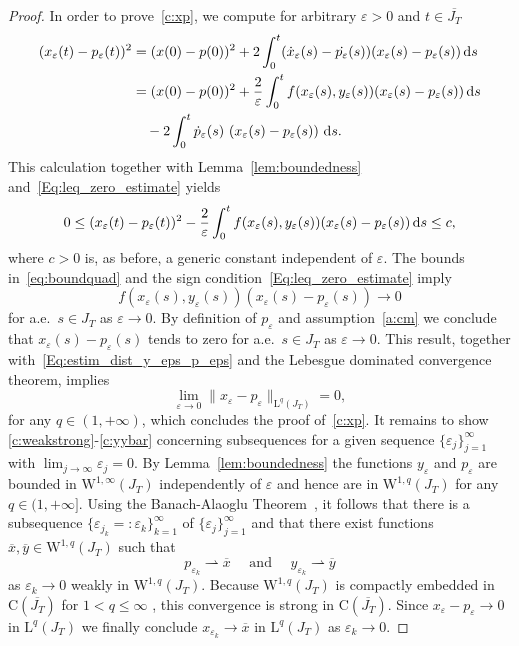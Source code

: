 \documentclass[12pt]{article}
\def\I{\infty}
\def\txtd{{\textnormal{d}}}
\newcommand{\be}{\begin{equation}}
\newcommand{\ee}{\end{equation}}
\newcommand{\benn}{\begin{equation*}}
\newcommand{\eenn}{\end{equation*}}
\def\ra{\rightarrow}
\def\I{\infty}
\begin{document}
\begin{proof}
In order to prove~\ref{c:xp}, we compute for arbitrary $\varepsilon>0$ and 
$t\in\overline{J_T}$
\begin{align*}
(x_\varepsilon(t)-p_{\varepsilon}(t))^2 &= (x(0)-p(0))^2 
+ 2\int_0^t (\dot{x}_\varepsilon(s) - \dot{p_{\varepsilon}}(s)) (x_\varepsilon(s)
-p_{\varepsilon}(s)) \, \txtd s\\
&= (x(0)-p(0))^2 + \frac{2}{\varepsilon}\int_0^t f(x_\varepsilon(s),y_\varepsilon(s)) 
(x_\varepsilon(s)-p_{\varepsilon}(s))\, \txtd s\\
&\quad -2\int_0^t \dot{p}_{\varepsilon}(s)~ (x_\varepsilon(s)-p_{\varepsilon}(s))~\txtd s.
\end{align*}
This calculation together with Lemma~\ref{lem:boundedness} 
and~\eqref{Eq:leq_zero_estimate} yields
\be
\label{eq:boundquad}
0\leq (x_\varepsilon(t)-p_{\varepsilon}(t))^2 - 
\frac{2}{\varepsilon}\int_0^t f( x_\varepsilon(s) , y_\varepsilon(s) ) 
(x_\varepsilon(s)-p_{\varepsilon}(s))\, \txtd s\leq c,
\ee
where $c>0$ is, as before, a generic constant independent of $\varepsilon$.	The bounds 
in~\eqref{eq:boundquad} and the sign condition~\eqref{Eq:leq_zero_estimate} imply
\benn
f( x_\varepsilon(s) , y_\varepsilon(s) )(x_\varepsilon(s)-p_{\varepsilon}(s))\ra 0
\eenn
for a.e.~$s\in J_T$ as $\varepsilon\rightarrow 0$. By definition of $p_\varepsilon$ and 
assumption~\ref{a:cm} we conclude that $x_\varepsilon(s)-p_{\varepsilon}(s)$ tends to 
zero for a.e.~$s\in J_T$ as $\varepsilon\rightarrow 0$. This result, together 
with~\eqref{Eq:estim_dist_y_eps_p_eps} and the Lebesgue dominated convergence theorem, 
implies
\benn
\lim_{\varepsilon\ra 0}\|x_\varepsilon - p_\varepsilon \|_{\mathrm{L}^q(J_T)} = 0,
\eenn
for any $q\in(1,+\I)$, which concludes the proof of~\ref{c:xp}. It remains to show  
\ref{c:weakstrong}-\ref{c:yybar} concerning subsequences for a given sequence 
$\{\varepsilon_j\}_{j=1}^\I$ with $\lim_{j\ra \I}\varepsilon_j=0$. By 
Lemma~\ref{lem:boundedness} the functions $y_{\varepsilon}$ and $p_{\varepsilon}$ are 
bounded in $\mathrm{W}^{1,\infty}(J_T)$ independently of $\varepsilon$ and hence are
in $\mathrm{W}^{1,q}(J_T)$ for any $q\in(1,+\I]$. Using the Banach-Alaoglu
Theorem~\cite{RudinFunc}, it follows that there is a subsequence 
$\{\varepsilon_{j_k}=:\varepsilon_k\}_{k=1}^\I$ of $\{\varepsilon_j\}_{j=1}^\I$ and 
that there exist functions $\overline{x},\overline{y}\in \mathrm{W}^{1,q}(J_T)$ such 
that
\be
\label{Conv_subseq_p_and_x1}
p_{\varepsilon_k} \rightharpoonup \overline{x} \quad 
\text{ and } \quad y_{\varepsilon_k} \rightharpoonup \overline{y}
\ee
as $\varepsilon_k \rightarrow 0$ weakly in $\mathrm{W}^{1,q}(J_T)$. Because 
$\mathrm{W}^{1,q}(J_T)$ is compactly embedded in $\mathrm{C}(\overline{J_T})$ for 
$1<q\leq \infty$ \cite[Theorem~6.3]{AdamsFournier}, this convergence is strong in 
$\mathrm{C}(\overline{J_T})$. Since $x_\varepsilon - p_\varepsilon \rightarrow 0$ 
in $\mathrm{L}^q(J_T)$ we finally conclude $x_{\varepsilon_k} \ra \overline{x}$
in $\mathrm{L}^q(J_T)$ as $\varepsilon_k \rightarrow 0$.
\end{proof}
\end{document}

